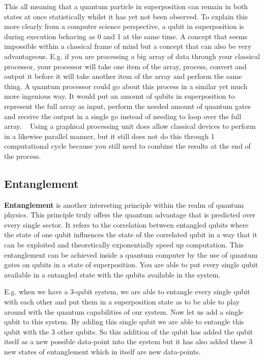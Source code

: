 This all meaning that a quantum particle in superposition can remain in both states at once statistically whilst it has yet not been observed. To explain this more clearly from a computer science perspective, a qubit in superposition is during execution behaving as 0 and 1 at the same time. A concept that seems impossible within a classical frame of mind but a concept that can also be very advantageous. E.g. if you are processing a big array of data through your classical processor, your processor will take one item of the array, process, convert and output it before it will take another item of the array and perform the same thing. A quantum processor could go about this process in a similar yet much more ingenious way. It would put an amount of qubits in superposition to represent the full array as input, perform the needed amount of quantum gates and receive the output in a single go instead of needing to loop over the full array. ~\autocite{Draper2000} Using a graphical processing unit does allow classical devices to perform in a likewise parallel manner, but it still does not do this through 1 computational cycle because you still need to combine the results at the end of the process.

\subsection{Entanglement}
\textbf{Entanglement} is another interesting principle within the realm of quantum physics. This principle truly offers the quantum advantage that is predicted over every single sector. 
It refers to the correlation between entangled qubits where the state of one qubit influences the state of the correlated qubit in a way that it can be exploited and theoretically exponentially speed up computation. This entanglement can be achieved inside a quantum computer by the use of quantum gates on qubits in a state of superposition. You are able to put every single qubit available in a entangled state with the qubits available in the system. 

E.g. when we have a 3-qubit system, we are able to entangle every single qubit with each other and put them in a superposition state as to be able to play around with the quantum capabilities of our system. Now let us add a single qubit to this system. By adding this single qubit we are able to entangle this qubit with the 3 other qubits. So this addition of the qubit has added the qubit itself as a new possible data-point into the system but it has also added these 3 new states of entanglement which in itself are new data-points. 

